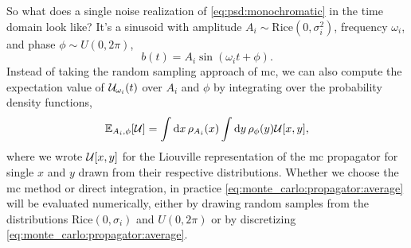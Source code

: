 So what does a single noise realization of \cref{eq:psd:monochromatic} in the time domain look like? 
It's a sinusoid with amplitude $A_i \sim \text{Rice}(0, \sigma_i^2)$, frequency $\omega_i$, and phase $\phi \sim U(0, 2\pi)$,
\begin{equation}
    b(t) = A_i\sin(\omega_i t + \phi).
\end{equation}
Instead of taking the random sampling approach of \gls{mc}, we can also compute the expectation value of $\mathcal{U}_{\omega_i}(t)$ over $A_i$ and $\phi$ by integrating over the probability density functions,
\begin{equation}
    \label{eq:monte_carlo:propagator:average}
    \mathbb{E}_{A_i,\phi}[\mathcal{U}] = \int\dd{x}\rho_{A_i}(x)\int\dd{y}\rho_{\phi}(y)\mathcal{U}[x, y],
\end{equation}
where we wrote $\mathcal{U}[x, y]$ for the Liouville representation of the \gls{mc} propagator for single $x$ and $y$ drawn from their respective distributions.
Whether we choose the \gls{mc} method or direct integration, in practice \cref{eq:monte_carlo:propagator:average} will be evaluated numerically, either by drawing random samples from the distributions $\text{Rice}(0, \sigma_i)$ and $U(0,2\pi)$ or by discretizing \cref{eq:monte_carlo:propagator:average}.

